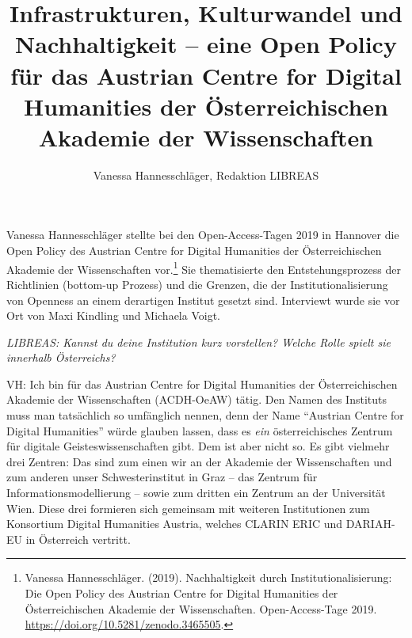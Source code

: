 \documentclass[a4paper,
fontsize=11pt,
oneside,
numbers=noperiodatend,
parskip=half-,
bibliography=totoc,
final
]{scrartcl}
\title{\LARGE{Infrastrukturen, Kulturwandel und Nachhaltigkeit – eine Open Policy für das Austrian Centre for Digital Humanities der Österreichischen Akademie der Wissenschaften}} %
\author{Vanessa Hannesschläger, Redaktion LIBREAS} %
\date{}
\begin{document}
\maketitle
\thispagestyle{fancyplain} 


Vanessa Hannesschläger stellte bei den Open-Access-Tagen 2019 in
Hannover die Open Policy des Austrian Centre for Digital Humanities der
Österreichischen Akademie der Wissenschaften vor.\footnote{Vanessa
  Hannesschläger. (2019). Nachhaltigkeit durch Institutionalisierung:
  Die Open Policy des Austrian Centre for Digital Humanities der
  Österreichischen Akademie der Wissenschaften. Open-Access-Tage 2019.
  \url{https://doi.org/10.5281/zenodo.3465505}.} Sie thematisierte den
Entstehungsprozess der Richtlinien (bottom-up Prozess) und die Grenzen,
die der Institutionalisierung von Openness an einem derartigen Institut
gesetzt sind. Interviewt wurde sie vor Ort von Maxi Kindling und
Michaela Voigt.

\emph{LIBREAS: Kannst du deine Institution kurz vorstellen? Welche Rolle
spielt sie innerhalb Österreichs?}

VH: Ich bin für das Austrian Centre for Digital Humanities der
Österreichischen Akademie der Wissenschaften (ACDH-OeAW) tätig. Den
Namen des Instituts muss man tatsächlich so umfänglich nennen, denn der
Name \enquote{Austrian Centre for Digital Humanities} würde glauben lassen,
dass es \emph{ein} österreichisches Zentrum für digitale
Geisteswissenschaften gibt. Dem ist aber nicht so. Es gibt vielmehr drei
Zentren: Das sind zum einen wir an der Akademie der Wissenschaften und
zum anderen unser Schwesterinstitut in Graz -- das Zentrum für
Informationsmodellierung -- sowie zum dritten ein Zentrum an der
Universität Wien. Diese drei formieren sich gemeinsam mit weiteren
Institutionen zum Konsortium Digital Humanities Austria, welches CLARIN
ERIC und DARIAH-EU in Österreich vertritt.
\end{document}
